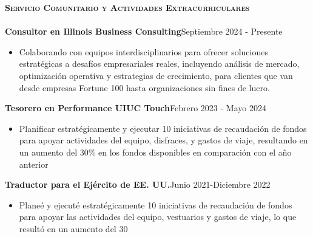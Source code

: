 \documentclass[a4paper]{article}
\newcommand{\lineunder} {
    \vspace*{-8pt} \\
    \hspace*{-18pt} \hrulefill \\
}
\newcommand{\header} [1] {
    {\hspace*{-18pt}\vspace*{6pt} \textsc{#1}}
    \vspace*{-6pt} \lineunder
}
\begin{document}
\vspace{1mm}


\header{\textbf{Servicio Comunitario y Actividades Extracurriculares}}

\textbf{Consultor en Illinois Business Consulting}\hfill Septiembre 2024 - Presente\\
\begin{itemize}[nolistsep] 
    \item Colaborando con equipos interdisciplinarios para ofrecer soluciones estratégicas a desafíos empresariales reales,
     incluyendo análisis de mercado, optimización operativa y estrategias de 
     crecimiento, para clientes que van desde empresas Fortune 100 hasta 
     organizaciones sin fines de lucro. 
\end{itemize}

\textbf{Tesorero en Performance UIUC Touch}\hfill Febrero 2023 - Mayo 2024\\
\begin{itemize}[nolistsep]
    \item Planificar estratégicamente y ejecutar 10 iniciativas de recaudación 
    de fondos para apoyar actividades del equipo, disfraces,
    y gastos de viaje, resultando en un aumento del 30\% 
    en los fondos disponibles en comparación con el año anterior
\end{itemize}

{\textbf{Traductor para el Ejército de EE. UU.}\hfill{Junio 2021-Diciembre 2022}}\\
\begin{itemize}[nolistsep]
    \item Planeé y ejecuté estratégicamente 10 iniciativas de recaudación de fondos para apoyar las actividades del equipo, vestuarios y gastos de viaje, lo que resultó en un aumento del 30%
    \end{itemize}

\vspace*{1mm}
\end{document}
